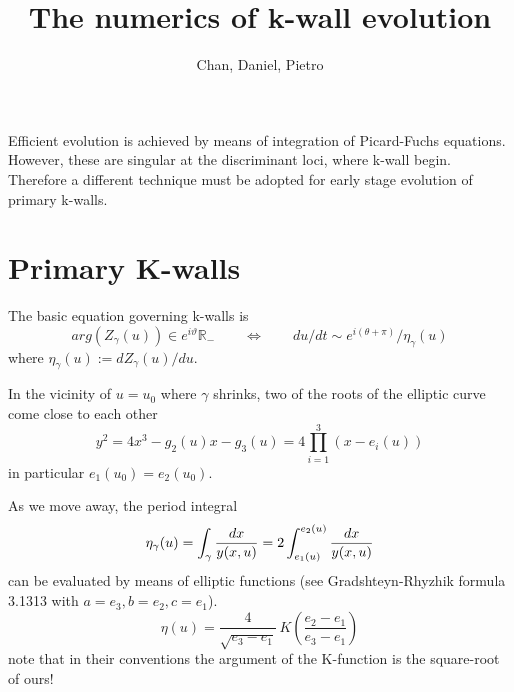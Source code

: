 \documentclass[11pt]{article}
\title{	The numerics of k-wall evolution}
\author{Chan, Daniel, Pietro}
\newcommand{\be}{\begin{equation}}
\newcommand{\ee}{\end{equation}}
\newcommand{\IR}{\mathbb{R}}
\begin{document}
\maketitle
\tableofcontents

Efficient evolution is achieved by means of integration of Picard-Fuchs equations.
However, these are singular at the discriminant loci, where k-wall begin. Therefore a different technique must be adopted for early stage evolution of primary k-walls.

\section{Primary K-walls}
The basic equation governing k-walls is
\be
	arg(Z_{\gamma}(u)) \in e^{i\vartheta}\IR_{-} \qquad \Leftrightarrow \qquad du/dt \sim e^{i(\theta +\pi)} / \eta_{\gamma}(u)
\ee
where $\eta_{\gamma}(u):=dZ_{\gamma}(u) / du$.

In the vicinity of $u=u_{0}$ where $\gamma$ shrinks, two of the roots of the elliptic curve come close to each other
\be
	y^{2} = 4 x^{3} - g_{2}(u) x -g_{3}(u) = 4\prod_{i=1}^{3}(x-e_{i}(u))
\ee
in particular $e_{1}(u_{0})= e_{2}(u_{0})$.

As we move away, the period integral
\be
	\eta_{\gamma}(u) = \int_{\gamma} {dx\over y(x,u)} = 2 \int_{e_{1}(u)}^{e_{2}(u)}{dx\over y(x,u)}
\ee
can be evaluated by means of elliptic functions (see Gradshteyn-Rhyzhik formula 3.1313 with $a=e_{3}, b=e_{2}, c=e_{1}$).
\be
	\eta(u) = \frac{4}{\sqrt{e_{3}-e_{1}}} \, K\left( \frac{e_{2}-e_{1}}{e_{3}-e_{1}} \right)
\ee
note that in their conventions the argument of the K-function is the square-root of ours!
\end{document}
